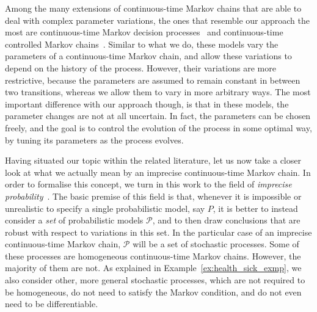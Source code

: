 \documentclass[10pt,a4paper]{paper}
\theoremstyle{definition}
\begin{document}
Among the many extensions of continuous-time Markov chains that are able to deal with complex parameter variations, the ones that resemble our approach the most are continuous-time Markov decision processes~\cite{Xianping:2009} and continuous-time controlled Markov chains~\cite{guo2003}. Similar to what we do, these models vary the parameters of a continuous-time Markov chain, and allow these variations to depend on the history of the process. However, their variations are more restrictive, because the parameters are assumed to remain constant in between two transitions, whereas we allow them to vary in more arbitrary ways. The most important difference with our approach though, is that in these models, the parameter changes are not at all uncertain. In fact, the parameters can be chosen freely, and the goal is to control the evolution of the process in some optimal way, by tuning its parameters as the process evolves.


Having situated our topic within the related literature, let us now take a closer look at what we actually mean by an imprecise continuous-time Markov chain.
In order to formalise this concept, we turn in this work to the field of \emph{imprecise probability}~\cite{Walley:1991vk,troffaes2013:lp,augustin2013:itip}. The basic premise of this field is that, whenever it is impossible or unrealistic to specify a single probabilistic model, say $P$, it is better to instead consider a \emph{set} of probabilistic models $\mathcal{P}$, and to then draw conclusions that are robust with respect to variations in this set. In the particular case of an imprecise continuous-time Markov chain, $\mathcal{P}$ will be a set of stochastic processes. Some of these processes are homogeneous continuous-time Markov chains. However, the majority of them are not. As explained in Example~\ref{ex:health_sick_exmp}, we also consider other, more general stochastic processes, which are not required to be homogeneous, do not need to satisfy the Markov condition, and do not even need to be differentiable. 
\end{document}
